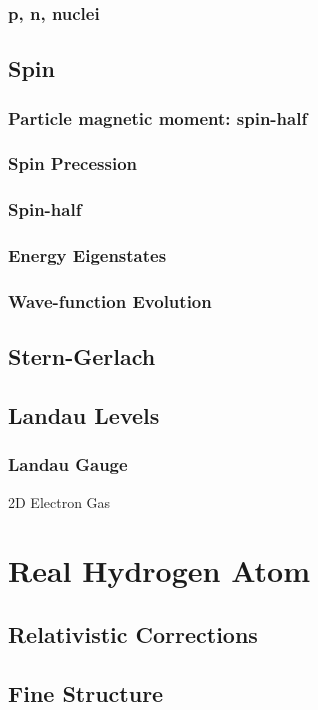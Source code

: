 \documentclass[12pt,a4paper]{article}
\begin{document}
\subsubsection{p, n, nuclei}
\subsection{Spin}
\subsubsection{Particle magnetic moment: spin-half}
\subsubsection{Spin Precession}
\subsubsection{Spin-half}
\subsubsection{Energy Eigenstates}


\subsubsection{Wave-function Evolution}
\subsection{Stern-Gerlach}
\subsection{Landau Levels}
\subsubsection{Landau Gauge}
\begin{example}
    {2D Electron Gas}
    {}
\end{example}
\section{Real Hydrogen Atom}
\subsection{Relativistic Corrections}
\subsection{Fine Structure}
\end{document}
